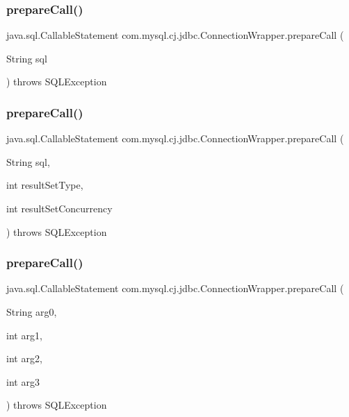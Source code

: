 \subsubsection{\texorpdfstring{prepare\+Call()}{prepareCall()}\hspace{0.1cm}{\footnotesize\ttfamily [1/3]}}
{\footnotesize\ttfamily java.\+sql.\+Callable\+Statement com.\+mysql.\+cj.\+jdbc.\+Connection\+Wrapper.\+prepare\+Call (\begin{DoxyParamCaption}\item[{String}]{sql }\end{DoxyParamCaption}) throws S\+Q\+L\+Exception}

\mbox{\label{classcom_1_1mysql_1_1cj_1_1jdbc_1_1_connection_wrapper_ab4275f28104d43202583c58f600d320e}} 
\subsubsection{\texorpdfstring{prepare\+Call()}{prepareCall()}\hspace{0.1cm}{\footnotesize\ttfamily [2/3]}}
{\footnotesize\ttfamily java.\+sql.\+Callable\+Statement com.\+mysql.\+cj.\+jdbc.\+Connection\+Wrapper.\+prepare\+Call (\begin{DoxyParamCaption}\item[{String}]{sql,  }\item[{int}]{result\+Set\+Type,  }\item[{int}]{result\+Set\+Concurrency }\end{DoxyParamCaption}) throws S\+Q\+L\+Exception}

\mbox{\label{classcom_1_1mysql_1_1cj_1_1jdbc_1_1_connection_wrapper_af1c5e71dfedb6faeeff1964a37ea833a}} 
\subsubsection{\texorpdfstring{prepare\+Call()}{prepareCall()}\hspace{0.1cm}{\footnotesize\ttfamily [3/3]}}
{\footnotesize\ttfamily java.\+sql.\+Callable\+Statement com.\+mysql.\+cj.\+jdbc.\+Connection\+Wrapper.\+prepare\+Call (\begin{DoxyParamCaption}\item[{String}]{arg0,  }\item[{int}]{arg1,  }\item[{int}]{arg2,  }\item[{int}]{arg3 }\end{DoxyParamCaption}) throws S\+Q\+L\+Exception}

